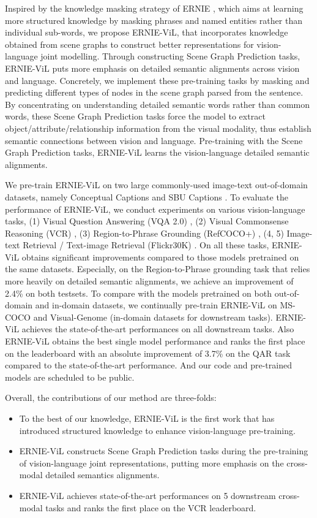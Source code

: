 \documentclass[letterpaper]{article} \usepackage{aaai21}  \usepackage{times}  \usepackage{helvet} \usepackage{courier}  \usepackage[hyphens]{url}  \usepackage{graphicx} \urlstyle{rm} \def\UrlFont{\rm}  \usepackage{natbib}  \usepackage{caption} \frenchspacing  \setlength{\pdfpagewidth}{8.5in}  \setlength{\pdfpageheight}{11in}  \usepackage{cite}
\begin{document}
Inspired by the knowledge masking strategy of ERNIE \cite{sun2019ernie2}, which aims at learning more structured knowledge by masking phrases and named entities rather than individual sub-words, we propose ERNIE-ViL, that incorporates knowledge obtained from scene graphs \cite{johnson2015image} to construct better representations for vision-language joint modelling. Through constructing Scene Graph Prediction tasks, ERNIE-ViL puts more emphasis on detailed semantic alignments across vision and language. Concretely, we implement these pre-training tasks by masking and predicting different types of nodes in the scene graph parsed from the sentence. By concentrating on understanding detailed semantic words rather than common words, these Scene Graph Prediction tasks force the model to extract object/attribute/relationship information from the visual modality, thus establish semantic connections between vision and language.
Pre-training with the Scene Graph Prediction tasks, ERNIE-ViL learns the  vision-language detailed semantic alignments. 

We pre-train ERNIE-ViL on two large commonly-used image-text out-of-domain datasets, namely Conceptual Captions \cite{sharma2018conceptual} and SBU Captions \cite{ordonez2011im2text}. To evaluate the performance of ERNIE-ViL, we conduct experiments on various vision-language tasks,  (1) Visual Question Answering (VQA 2.0) \cite{antol2015vqa}, (2) Visual Commonsense Reasoning (VCR) \cite{zellers2019recognition}, (3) Region-to-Phrase Grounding (RefCOCO+) \cite{kazemzadeh2014referitgame}, (4, 5) Image-text Retrieval / Text-image Retrieval (Flickr30K) \cite{young2014image}. On all these tasks, ERNIE-ViL obtains significant improvements compared to those models pretrained on the same datasets. Especially, on the Region-to-Phrase grounding task that 
relies more   heavily on detailed semantic alignments, we achieve an improvement of  2.4\% on both testsets. To compare with the models pretrained on both out-of-domain and in-domain datasets, we continually pre-train ERNIE-ViL on MS-COCO  \cite{lin2014microsoft}  and Visual-Genome \cite{krishna2017visual} (in-domain datasets for downstream tasks). ERNIE-ViL achieves the  state-of-the-art performances on all downstream tasks. Also ERNIE-ViL obtains the best single model performance and ranks the first place on the leaderboard with an absolute improvement of 3.7\% on the QAR task compared to the state-of-the-art performance. And our code and pre-trained models are scheduled to be public.
 
Overall, the contributions of our method are three-folds:
\begin{itemize}
 \item To the best of our knowledge, ERNIE-ViL is the first work that has introduced structured knowledge to enhance vision-language pre-training.
\item ERNIE-ViL constructs Scene Graph Prediction tasks during the pre-training of vision-language joint representations, putting more emphasis on the cross-modal detailed semantics alignments.
\item ERNIE-ViL achieves state-of-the-art performances on 5 downstream cross-modal tasks and ranks the first place on the VCR leaderboard.
\end{itemize}
\end{document}
